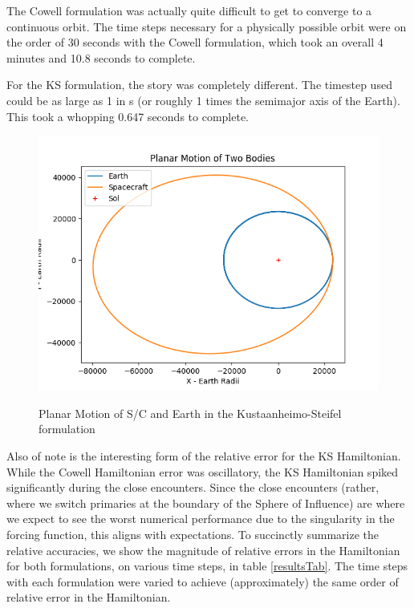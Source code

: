 \documentclass[11pt,twoside,letterpaper]{article}
\begin{document}
  The Cowell formulation was actually quite difficult to get to
  converge to a continuous orbit. The time steps necessary for a
  physically possible orbit were on the order of 30 seconds with the
  Cowell formulation, which took an overall 4 minutes and 10.8 seconds
  to complete.

  For the KS formulation, the story was completely different. The
  timestep used could be as large as 1 in s (or roughly 1 times the
  semimajor axis of the Earth). This took a whopping 0.647 seconds to
  complete.

  \begin{figure}
    \caption{Planar Motion of S/C and Earth in the Kustaanheimo-Steifel formulation}
    \centering
    \includegraphics[scale=0.5]{PlanarPathKS}
    \label{kspath}
  \end{figure}

  Also of note is the interesting form of the relative error for the
  KS Hamiltonian. While the Cowell Hamiltonian error was oscillatory,
  the KS Hamiltonian spiked significantly during the close
  encounters. Since the close encounters (rather, where we switch
  primaries at the boundary of the Sphere of Influence) are where we
  expect to see the worst numerical performance due to the singularity
  in the forcing function, this aligns with expectations. To
  succinctly summarize the relative accuracies, we show the magnitude
  of relative errors in the Hamiltonian for both formulations, on
  various time steps, in table \ref{resultsTab}. The time steps with
  each formulation were varied to achieve (approximately) the same
  order of relative error in the Hamiltonian. 
\end{document}
